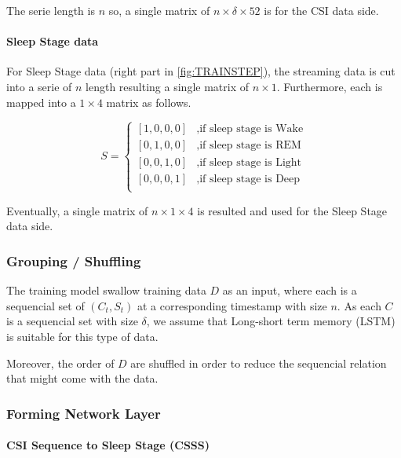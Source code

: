 \documentclass[10pt,letterpaper]{article}
\begin{document}
 The serie length is $n$ so, a single matrix of  $n \times \delta \times 52$ is for the CSI data side.
	
	\paragraph{Sleep Stage data}
	For Sleep Stage data (right part in \ref{fig:TRAINSTEP}), the streaming data is cut into a serie of  $n$ length resulting a single matrix of  $n \times 1$. Furthermore, each is mapped into a $1 \times 4$ matrix as follows.

	\begin{equation}
		S = \begin{cases}
		[1,0,0,0] &\text{,if sleep stage is Wake}\\
		[0,1,0,0] &\text{,if sleep stage is REM}\\
		[0,0,1,0] &\text{,if sleep stage is Light}\\
		[0,0,0,1] &\text{,if sleep stage is Deep}\\
	\end{cases}
	\label{eq:SSparser}
\end{equation}	
		
	Eventually, a single matrix of  $n \times 1 \times 4$ is resulted and used for the Sleep Stage data side.
	
	\subsubsection*{Grouping / Shuffling}
	
	
	The training model swallow training data $D$ as an input, where each is a sequencial set of $(C_t,S_t)$ at a corresponding timestamp with size $n$.	
	As each $C$ is a sequencial set with size $\delta$, we assume that Long-short term memory (LSTM) \cite{hochreiterS} is suitable for this type of data.
	
	Moreover, the order of $D$ are shuffled in order to reduce the sequencial relation that might come with the data.
	
	\subsubsection*{Forming Network Layer}
	
	\paragraph*{CSI Sequence to Sleep Stage (CSSS)}
	
\end{document}
